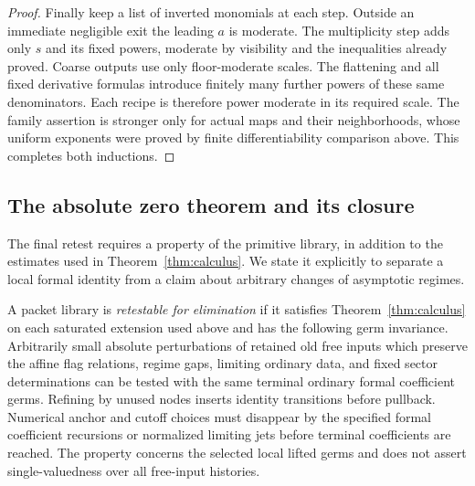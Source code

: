 \begin{proof}
Finally keep a list of inverted monomials at each step.  Outside an
immediate negligible exit the leading $a$ is moderate.  The
multiplicity step adds only $s$ and its fixed powers, moderate by
visibility and the inequalities already proved.  Coarse outputs
use only floor-moderate scales.  The flattening and all fixed
derivative formulas introduce finitely many further powers of these
same denominators.  Each recipe is therefore power moderate in its
required scale.  The family assertion is stronger only for actual
maps and their neighborhoods, whose uniform exponents were proved
by finite differentiability comparison above.  This completes both
inductions.
\end{proof}

\subsection{The absolute zero theorem and its closure}

The final retest requires a property of the primitive library, in
addition to the estimates used in Theorem~\ref{thm:calculus}.  We
state it explicitly to separate a local formal identity from a
claim about arbitrary changes of asymptotic regimes.

\begin{definition}\label{def:elimination-retestable}
A packet library is \emph{retestable for elimination} if it satisfies
Theorem~\ref{thm:calculus} on each saturated extension used above and
has the following germ invariance.  Arbitrarily small absolute
perturbations of retained old free inputs which preserve the affine
flag relations, regime gaps, limiting ordinary data, and fixed sector
determinations can be tested with the same terminal ordinary formal
coefficient germs.  Refining by unused nodes inserts identity
transitions before pullback.  Numerical anchor and cutoff choices
must disappear by the specified formal coefficient recursions or
normalized limiting jets before terminal coefficients are reached.
The property concerns the selected local lifted germs and does not
assert single-valuedness over all free-input histories.
\end{definition}

